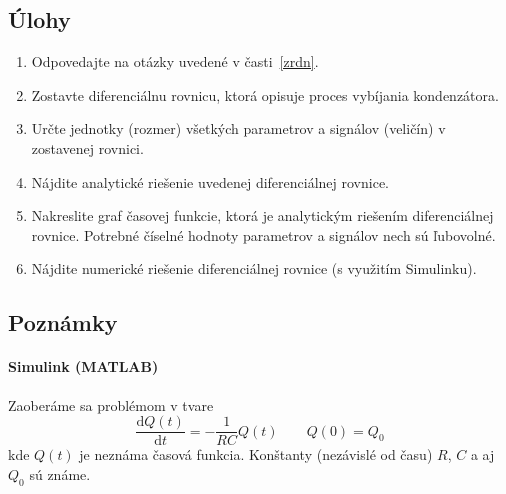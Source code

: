 \documentclass[a4paper, 10pt, ]{article}
\begin{document}
\subsection{Úlohy}

\begin{enumerate}[leftmargin=0pt, labelsep=4mm, itemsep=0pt]


    \item Odpovedajte na otázky uvedené v časti~\ref{zrdn}.

	\item Zostavte diferenciálnu rovnicu, ktorá opisuje proces vybíjania kondenzátora.

    \item Určte jednotky (rozmer) všetkých parametrov a signálov (veličín) v zostavenej rovnici.

    \item Nájdite analytické riešenie uvedenej diferenciálnej rovnice.

    \item Nakreslite graf časovej funkcie, ktorá je analytickým riešením diferenciálnej rovnice. Potrebné číselné hodnoty parametrov a signálov nech sú ľubovolné.

    \item Nájdite numerické riešenie diferenciálnej rovnice (s využitím Simulinku).

\end{enumerate}

\subsection{Poznámky}


\paragraph{Simulink (MATLAB)}

Zaoberáme sa problémom v tvare
\begin{equation} \label{diffRbeta222}
    \frac{\text{d}Q(t)}{\text{d}t} = - \frac{1}{RC} Q(t) \qquad Q(0) = Q_0
\end{equation}
kde $Q(t)$ je neznáma časová funkcia. Konštanty (nezávislé od času) $R$, $C$ a aj $Q_0$ sú známe.


\begin{center}


    \vspace{-5mm}

	\label{sim_Q}

    \vspace{-1mm}

\end{center}
\end{document}
